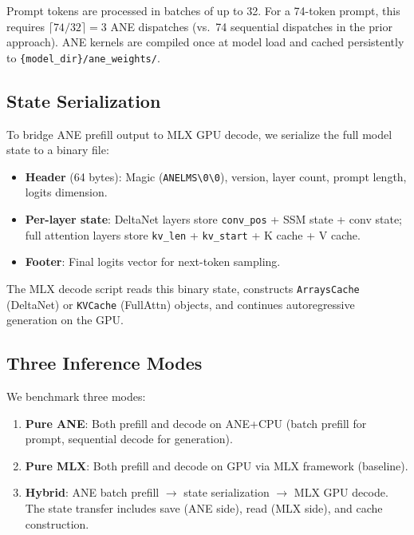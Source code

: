 \documentclass[11pt]{article}
\begin{document}
Prompt tokens are processed in batches of up to 32. For a 74-token prompt,
this requires $\lceil 74/32 \rceil = 3$ ANE dispatches (vs.\ 74 sequential
dispatches in the prior approach). ANE kernels are compiled once at model
load and cached persistently to \texttt{\{model\_dir\}/ane\_weights/}.

\subsection{State Serialization}

To bridge ANE prefill output to MLX GPU decode, we serialize the full
model state to a binary file:

\begin{itemize}[nosep]
  \item \textbf{Header} (64 bytes): Magic (\texttt{ANELMS\textbackslash0\textbackslash0}),
        version, layer count, prompt length, logits dimension.
  \item \textbf{Per-layer state}: DeltaNet layers store
        \texttt{conv\_pos} + SSM state + conv state; full attention layers
        store \texttt{kv\_len} + \texttt{kv\_start} + K cache + V cache.
  \item \textbf{Footer}: Final logits vector for next-token sampling.
\end{itemize}

The MLX decode script reads this binary state, constructs
\texttt{ArraysCache} (DeltaNet) or \texttt{KVCache} (FullAttn)
objects, and continues autoregressive generation on the GPU.

\subsection{Three Inference Modes}

We benchmark three modes:
\begin{enumerate}[nosep]
  \item \textbf{Pure ANE}: Both prefill and decode on ANE+CPU (batch
        prefill for prompt, sequential decode for generation).
  \item \textbf{Pure MLX}: Both prefill and decode on GPU via MLX
        framework (baseline).
  \item \textbf{Hybrid}: ANE batch prefill $\rightarrow$ state
        serialization $\rightarrow$ MLX GPU decode. The state transfer
        includes save (ANE side), read (MLX side), and cache construction.
\end{enumerate}
\end{document}
